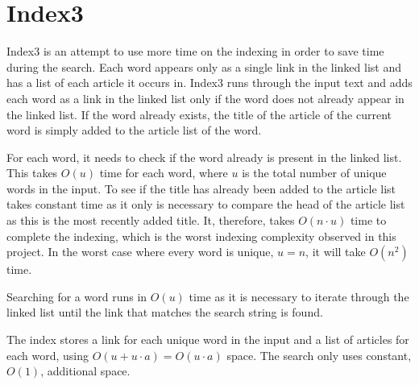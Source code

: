 \section{Index3}
\label{section:Index3}

Index3 is an attempt to use more time on the indexing in order to save time during the search. Each word appears only as a single link in the linked list and has a list of each article it occurs in. Index3 runs through the input text and adds each word as a link in the linked list only if the word does not already appear in the linked list. If the word already exists, the title of the article of the current word is simply added to the article list of the word.

For each word, it needs to check if the word already is present in the linked list. This takes $O(u)$ time for each word, where $u$ is the total number of unique words in the input. To see if the title has already been added to the article list takes constant time as it only is necessary to compare the head of the article list as this is the most recently added title. It, therefore, takes $O(n\cdot u)$ time to complete the indexing, which is the worst indexing complexity observed in this project. In the worst case where every word is unique, $u=n$, it will take $O(n^2)$ time. 

Searching for a word runs in $O(u)$ time as it is necessary to iterate through the linked list until the link that matches the search string is found. 

The index stores a link for each unique word in the input and a list of articles for each word, using $O(u + u\cdot a) = O(u\cdot a)$ space. The search only uses constant, $O(1)$, additional space. 
